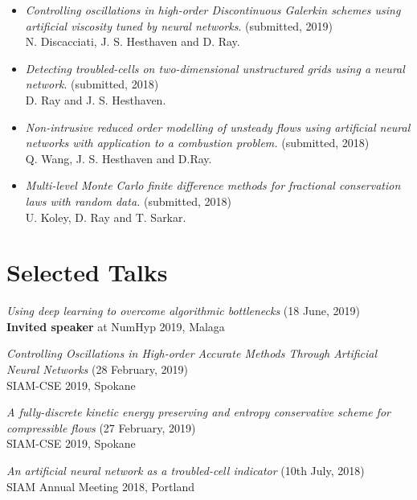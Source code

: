 \documentclass[margin]{res}
\begin{document}
\begin{resume}
\begin{itemize}
               \item {\it Controlling oscillations in high-order Discontinuous Galerkin schemes using artificial viscosity tuned by neural networks}. (submitted, 2019) \\
               N. Discacciati, J. S. Hesthaven and D. Ray.
              
              \item {\it Detecting troubled-cells on two-dimensional unstructured grids using a neural network}. (submitted, 2018) \\
               D. Ray and J. S. Hesthaven.
               
              \item {\it Non-intrusive reduced order modelling of unsteady flows using artificial neural networks with application to a combustion problem.} (submitted, 2018)\\
              Q. Wang, J. S. Hesthaven and D.Ray.
           
              \item {\it Multi-level Monte Carlo finite difference methods for fractional conservation laws with random data.} (submitted, 2018)\\
              U. Koley, D. Ray and T. Sarkar.

             \end{itemize}

             
\section{Selected Talks}
  
              {\it Using deep learning to overcome algorithmic bottlenecks} (18 June, 2019)\\
              \textbf{Invited speaker} at NumHyp 2019, Malaga
                         
             {\it Controlling Oscillations in High-order Accurate Methods Through Artificial Neural Networks} (28 February, 2019)\\
              SIAM-CSE 2019, Spokane
              
              {\it A fully-discrete kinetic energy preserving and entropy conservative scheme for compressible flows} (27 February, 2019)\\
              SIAM-CSE 2019, Spokane
             
              {\it An artificial neural network as a troubled-cell indicator} (10th July, 2018)\\
              SIAM Annual Meeting 2018, Portland
              

\end{resume}
\end{document}
